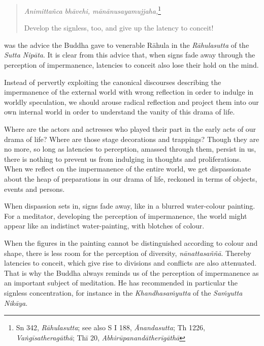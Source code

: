 \begin{quote}
\emph{Animittañca bhāvehi, mānānusayamujjaha,}\footnote{Sn 342, \emph{Rāhulasutta}; see also S I 188, \emph{Ānandasutta}; Th 1226, \emph{Vaṅgīsatheragāthā}; Thī 20, \emph{Abhirūpanandātherīgāthā}}

Develop the signless, too, and give up the latency to conceit!
\end{quote}

was the advice the Buddha gave to venerable Rāhula in the \emph{Rāhulasutta} of the \emph{Sutta Nipāta}. It is clear from this advice that, when signs fade away through the perception of impermanence, latencies to conceit also lose their hold on the mind.

Instead of pervertly exploiting the canonical discourses describing the impermanence of the external world with wrong reflection in order to indulge in worldly speculation, we should arouse radical reflection and project them into our own internal world in order to understand the vanity of this drama of life.

Where are the actors and actresses who played their part in the early acts of our drama of life? Where are those stage decorations and trappings? Though they are no more, so long as latencies to perception, amassed through them, persist in us, there is nothing to prevent us from indulging in thoughts and proliferations. When we reflect on the impermanence of the entire world, we get dispassionate about the heap of preparations in our drama of life, reckoned in terms of objects, events and persons.

When dispassion sets in, signs fade away, like in a blurred water-colour painting. For a meditator, developing the perception of impermanence, the world might appear like an indistinct water-painting, with blotches of colour.

When the figures in the painting cannot be distinguished according to colour and shape, there is less room for the perception of diversity, \emph{nānattasaññā}. Thereby latencies to conceit, which give rise to divisions and conflicts are also attenuated. That is why the Buddha always reminds us of the perception of impermanence as an important subject of meditation. He has recommended in particular the signless concentration, for instance in the \emph{Khandhasaṁyutta} of the \emph{Saṁyutta Nikāya}.

